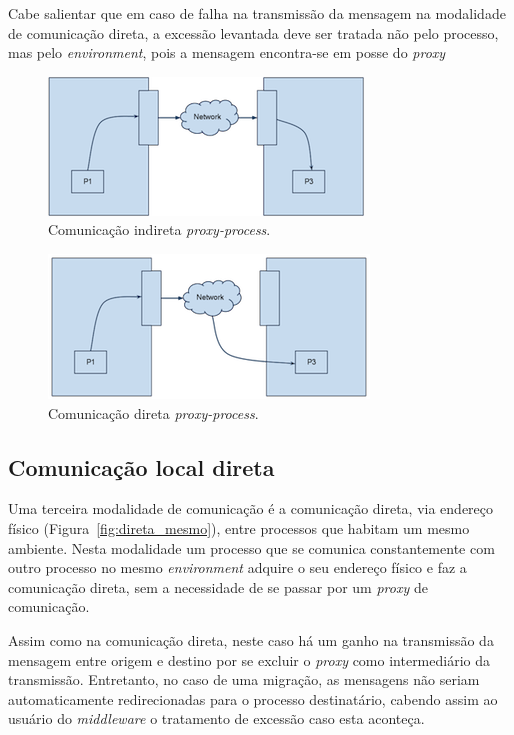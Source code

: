 Cabe salientar que em caso de falha na transmissão da mensagem na modalidade de comunicação direta, a excessão levantada deve ser tratada não pelo processo, mas pelo \textit{environment}, pois a mensagem encontra-se em posse do \textit{proxy}

\begin{figure}
  \centerline{\includegraphics{Communication_indireta.png}}
  \caption{Comunicação indireta \textit{proxy-process}.}
\label{fig:indireta}
\end{figure}

\begin{figure}
  \centerline{\includegraphics{Communication_direta.png}}
  \caption{Comunicação direta \textit{proxy-process}.}
\label{fig:direta}
\end{figure}

\subsection{Comunicação local direta}

Uma terceira modalidade de comunicação é a comunicação direta, via endereço físico (Figura~\ref{fig:direta_mesmo}), entre processos que habitam um mesmo ambiente. Nesta modalidade um processo que se comunica constantemente com outro processo no mesmo \textit{environment} adquire o seu endereço físico e faz a comunicação direta, sem a necessidade de se passar por um \textit{proxy} de comunicação.

Assim como na comunicação direta, neste caso há um ganho na transmissão da mensagem entre origem e destino por se excluir o \textit{proxy} como intermediário da transmissão. Entretanto, no caso de uma migração, as mensagens não seriam automaticamente redirecionadas para o processo destinatário, cabendo assim ao usuário do \textit{middleware} o tratamento de excessão caso esta aconteça.

